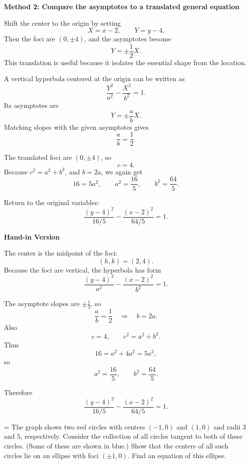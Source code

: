 \documentclass[a4paper,12pt,twocolumn]{article}
\newlength{\problemnumberwidth}
\newenvironment{solutionbox}{\begin{framed}}{\end{framed}}
\newcommand{\problem}[3]{%
  \Needspace{10\baselineskip}%
  \phantomsection\label{#1}%
  \par\vspace{0.8em}%
  \noindent
  \hangindent=\problemnumberwidth
  \hangafter=1
  \makebox[\problemnumberwidth][l]{\textbf{#2.}}#3\par
}
\begin{document}
\begin{solutionbox}
\textbf{Method 2: Compare the asymptotes to a translated general equation}

\begin{steps}
\item Shift the center to the origin by setting
\[
X=x-2,\qquad Y=y-4.
\]
Then the foci are \((0,\pm4)\), and the asymptotes become
\[
Y=\pm\frac12X.
\]
This translation is useful because it isolates the essential shape from the location.

\item A vertical hyperbola centered at the origin can be written as
\[
\frac{Y^2}{a^2}-\frac{X^2}{b^2}=1.
\]
Its asymptotes are
\[
Y=\pm\frac{a}{b}X.
\]
Matching slopes with the given asymptotes gives
\[
\frac{a}{b}=\frac12.
\]

\item The translated foci are \((0,\pm4)\), so
\[
c=4.
\]
Because \(c^2=a^2+b^2\), and \(b=2a\), we again get
\[
16=5a^2,
\qquad
a^2=\frac{16}{5},
\qquad
b^2=\frac{64}{5}.
\]

\item Return to the original variables:
\[
\boxed{\frac{(y-4)^2}{16/5}-\frac{(x-2)^2}{64/5}=1.}
\]
\end{steps}
\end{solutionbox}

\begin{solutionbox}
\textbf{Hand-in Version}

The center is the midpoint of the foci:
\[
(h,k)=(2,4).
\]
Because the foci are vertical, the hyperbola has form
\[
\frac{(y-4)^2}{a^2}-\frac{(x-2)^2}{b^2}=1.
\]

The asymptote slopes are \(\pm\frac12\), so
\[
\frac{a}{b}=\frac12 \quad\Longrightarrow\quad b=2a.
\]
Also
\[
c=4,\qquad c^2=a^2+b^2.
\]
Thus
\[
16=a^2+4a^2=5a^2,
\]
so
\[
a^2=\frac{16}{5},\qquad b^2=\frac{64}{5}.
\]

Therefore
\[
\boxed{\frac{(y-4)^2}{16/5}-\frac{(x-2)^2}{64/5}=1.}
\]
\end{solutionbox}

\problem{prob:10-5-69}{69}{The graph shows two red circles with centers \((-1,0)\) and \((1,0)\) and radii \(3\) and \(5\), respectively. Consider the collection of all circles tangent to both of these circles. (Some of these are shown in blue.) Show that the centers of all such circles lie on an ellipse with foci \((\pm1,0)\). Find an equation of this ellipse.}
\end{document}
